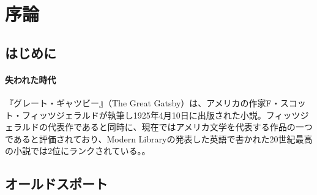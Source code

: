\chapter{序論}
\section{はじめに}
\subsubsection{失われた時代}
『グレート・ギャツビー』（The Great Gatsby）は、アメリカの作家F・スコット・フィッツジェラルドが執筆し1925年4月10日に出版された小説。フィッツジェラルドの代表作であると同時に、現在ではアメリカ文学を代表する作品の一つであると評価されており、Modern Libraryの発表した英語で書かれた20世紀最高の小説では2位にランクされている。\citep{gatsby}。

\section{オールドスポート}
